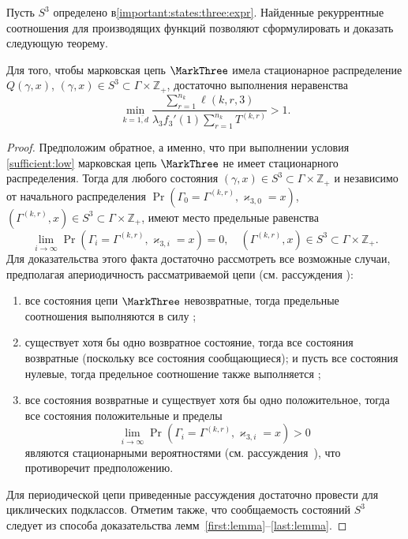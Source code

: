 Пусть $S^{3}$ определено в\eqref{important:states:three:expr}. Найденные рекуррентные соотношения для производящих функций позволяют сформулировать и доказать следующую теорему.
\begin{theorem}
Для того,  чтобы марковская цепь $\MarkThree$ имела стационарное распределение $Q(\gamma, x)$,  $(\gamma, x)\in S^{3} \subset \Gamma \times {\mathbb Z}_+$, достаточно выполнения неравенства 
\begin{equation}
\min_{k=\overline{1, d}} { \frac{\sum_{r = 1}^{n_k} \ell(k, r, 3) }{\lambda_3 f_3'(1) \sum_{r=1}^{n_k} T^{(k, r)} }}>1.
\label{sufficient:low}
\end{equation}
\label{sufficient:low:theorem}
\end{theorem}
\begin{proof}
Предположим обратное,  а именно,  что при выполнении условия \eqref{sufficient:low} марковская цепь $\MarkThree$ не имеет стационарного распределения. 
Тогда для любого состояния $(\gamma, x)\in S^{3} \subset  \Gamma \times {\mathbb Z}_+$ и независимо от начального распределения $\Pr(\Gamma_{0}=\Gamma^{(k, r)},  \varkappa_{3, 0}=x)$, 
$(\Gamma^{(k, r)}, x)\in S^{3} \subset  \Gamma \times {\mathbb Z}_+$,  
имеют место предельные равенства 
\begin{equation}
\lim_{i \to \infty} \Pr(\Gamma_{i}=\Gamma^{(k, r)},  \varkappa_{3, i}=x) =0,  \quad  (\Gamma^{(k, r)}, x)\in S^{3} \subset  \Gamma \times {\mathbb Z}_+.
\label{zero:limit:equations}
\end{equation} 
Для доказательства этого факта достаточно рассмотреть все возможные случаи,  предполагая апериодичность рассматриваемой цепи (см. рассуждения \cite[гл. $3$, \S~3-4]{Shiryaev}):
\begin{enumerate}[label={\arabic*)}]
\item все состояния цепи $\MarkThree$ невозвратные,  тогда предельные соотношения выполняются в силу \cite[с. 541,  лемма $2$]{Shiryaev};
\item существует хотя бы одно возвратное состояние,  тогда все состояния возвратные (поскольку все состояния сообщающиеся); и пусть все состояния нулевые,  тогда предельное соотношение также выполняется \cite[с. 541,  лемма $3$]{Shiryaev};
\item все состояния возвратные и существует хотя бы одно положительное,  тогда все состояния положительные и пределы 
$$
\lim_{i \to \infty} \Pr(\Gamma_{i}=\Gamma^{(k, r)},  \varkappa_{3, i}=x) > 0
$$
являются стационарными вероятностями (см. рассуждения~{\cite[с. 549,  теорема $1$]{Shiryaev}}),  что противоречит предположению.
\end{enumerate}
Для периодической цепи приведенные рассуждения достаточно провести для циклических подклассов. Отметим также, что сообщаемость состояний $S^{3}$ следует из способа доказательства лемм~\ref{first:lemma}--\ref{last:lemma}.


\end{proof}
